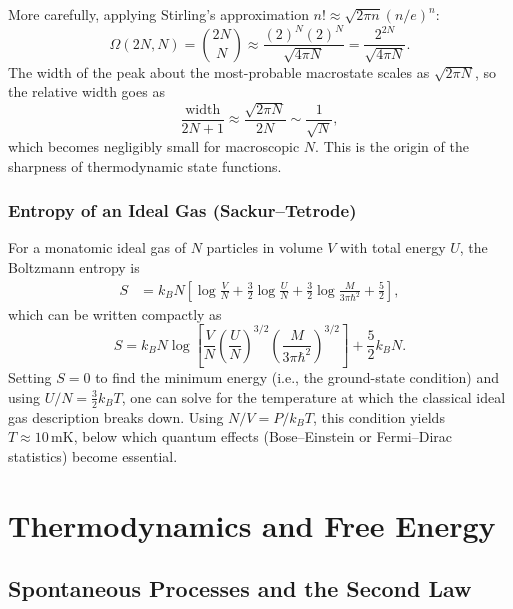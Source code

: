 More carefully, applying Stirling's approximation $n! \approx \sqrt{2\pi n}(n/e)^n$:
\begin{equation}
    \Omega(2N,N) = \binom{2N}{N} \approx \frac{(2)^N(2)^N}{\sqrt{4\pi N}} = \frac{2^{2N}}{\sqrt{4\pi N}}.
\end{equation}
The width of the peak about the most-probable macrostate scales as $\sqrt{2\pi N}$, so the relative width goes as
\begin{equation}
    \frac{\text{width}}{2N+1} \approx \frac{\sqrt{2\pi N}}{2N} \sim \frac{1}{\sqrt{N}},
\end{equation}
which becomes negligibly small for macroscopic $N$. This is the origin of the sharpness of thermodynamic state functions.

\subsection{Entropy of an Ideal Gas (Sackur--Tetrode)}

For a monatomic ideal gas of $N$ particles in volume $V$ with total energy $U$, the Boltzmann entropy is
\begin{align}
    S &= k_BN\left[\log\frac{V}{N} + \frac{3}{2}\log\frac{U}{N} + \frac{3}{2}\log\frac{M}{3\pi\hbar^2} + \frac{5}{2}\right],
\end{align}
which can be written compactly as
\begin{equation}
    S = k_BN\log\left[\frac{V}{N}\left(\frac{U}{N}\right)^{3/2}\!\left(\frac{M}{3\pi\hbar^2}\right)^{3/2}\right] + \frac{5}{2}k_BN.
\end{equation}
Setting $S = 0$ to find the minimum energy (i.e., the ground-state condition) and using $U/N = \frac{3}{2}k_BT$, one can solve for the temperature at which the classical ideal gas description breaks down. Using $N/V = P/k_BT$, this condition yields $T \approx 10\,\text{mK}$, below which quantum effects (Bose--Einstein or Fermi--Dirac statistics) become essential.


\chapter{Thermodynamics and Free Energy}

\section{Spontaneous Processes and the Second Law}

